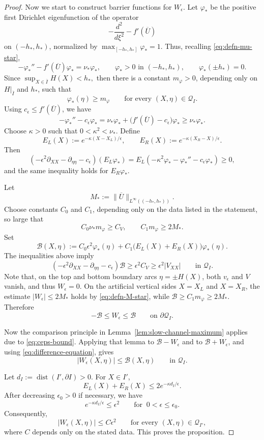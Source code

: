 \documentclass[reqno,12pt]{amsart}
\numberwithin{equation}{section}
\theoremstyle{remark}
\begin{document}
\begin{proof}
Now we start to construct barrier functions for $W_\epsilon$. 
Let $\varphi_*$ be the positive first Dirichlet eigenfunction of the operator
$$-\frac{d^2}{d\xi^2}-f'(\overline U)$$
on $(-h_*,h_*)$, normalized by $\max_{[-h_*,h_*]}\varphi_*=1. $
Thus, recalling \eqref{eq:defn-mu-star},
$$
-\varphi_*''-f'(\overline U)\varphi_*=\nu_*\varphi_*,
\qquad
\varphi_*>0\text{ in }(-h_*,h_*),
\qquad
\varphi_*(\pm h_*)=0.
$$
Since $\sup_{X\in\overline I}H(X)<h_*,$ then
there is a constant $m_\varphi>0$, depending only on $H|_{\overline I}$ and $h_*$, such that
$$
\varphi_*(\eta)\ge m_\varphi
\qquad\text{for every }(X,\eta)\in\mathcal Q_I.
$$
Using $c_\epsilon\le f'(\overline U)$, we have
$$
-\varphi_*''-c_\epsilon\varphi_*
= \nu_*\varphi_*+\bigl(f'(\overline U)-c_\epsilon\bigr)\varphi_*
\ge \nu_*\varphi_*.
$$
Choose $\kappa>0$ such that $0<\kappa^2<\nu_*.$
Define
$$
E_L(X):=e^{-\kappa(X-X_L)/\epsilon},
\qquad
E_R(X):=e^{-\kappa(X_R-X)/\epsilon}.
$$
Then
$$
\left(-\epsilon^2\partial_{XX}-\partial_{\eta\eta}-c_\epsilon\right)(E_L\varphi_*)
=E_L\left(-\kappa^2\varphi_*-\varphi_*''-c_\epsilon\varphi_*\right)
\ge 0,
$$
and the same inequality holds for $E_R\varphi_*$.

Let
\begin{equation}\label{eq:defn-M-star}
    M_*:=\|\overline U\|_{L^\infty((-h_*,h_*))}.
\end{equation}
Choose constants $C_0$ and $C_1$, depending only on the data listed in the
statement, so large that
$$
C_0\nu_* m_\varphi\ge C_V,
\qquad
C_1 m_\varphi\ge 2M_*.
$$
Set
$$
\mathcal B(X,\eta):=
C_0\epsilon^2\varphi_*(\eta)
+C_1\bigl(E_L(X)+E_R(X)\bigr)\varphi_*(\eta).
$$
The inequalities above imply
$$
\left(-\epsilon^2\partial_{XX}-\partial_{\eta\eta}-c_\epsilon\right) \mathcal B
\ge \epsilon^2 C_V
\ge \epsilon^2 \left| V_{XX}\right|
\qquad\text{in }\mathcal Q_I.
$$
Note that, on the top and bottom boundary arcs $\eta=\pm H(X)$, both $v_\epsilon$ and
$V$ vanish, and thus $W_\epsilon=0$.  On the artificial vertical sides $X=X_L$ and $X=X_R$,
the estimate $|W_\epsilon|\le2 M_*$ holds by \eqref{eq:defn-M-star}, while $\mathcal B\ge C_1m_\varphi\ge2 M_*$.
Therefore
$$
-\mathcal B\le W_\epsilon\le\mathcal B
\qquad\text{on }\partial\mathcal Q_I.
$$

Now the comparison principle in Lemma~\ref{lem:slow-channel-maximum} applies
due to \eqref{eq:ceps-bound}.
Applying that lemma to $\mathcal B-W_\epsilon$ and to
$\mathcal B+W_\epsilon$, and using \eqref{eq:difference-equation}, gives
$$
|W_\epsilon(X,\eta)|\le\mathcal B(X,\eta)
\qquad\text{in }\mathcal Q_I.
$$

Let $d_I:=\operatorname{dist}(I',\partial I)>0.$
For $X\in I'$,
$$
E_L(X)+E_R(X)
\le 2e^{-\kappa d_I/\epsilon}.
$$
After decreasing $\epsilon_0>0$ if necessary, we have
$$
e^{-\kappa d_I/\epsilon}\le \epsilon^2
\qquad\text{for }\ 0<\epsilon\le\epsilon_0.
$$
Consequently,
$$
|W_\epsilon(X,\eta)|\le C\epsilon^2
\qquad\text{for every }(X,\eta)\in\mathcal Q_{I'},
$$
where $C$ depends only on the stated data.  This proves the proposition.
\end{proof}
\end{document}
